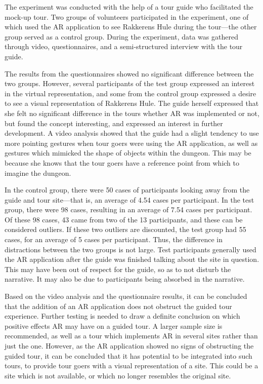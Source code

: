 The experiment was conducted with the help of a tour guide who facilitated the mock-up tour. Two groups of volunteers participated in the experiment, one of which used the AR application to see Rakkerens Hule during the tour---the other group served as a control group. During the experiment, data was gathered through video, questionnaires, and a semi-structured interview with the tour guide.

The results from the questionnaires showed no significant difference between the two groups. However, several participants of the test group expressed an interest in the virtual representation, and some from the control group expressed a desire to see a visual representation of Rakkerens Hule. The guide herself expressed that she felt no significant difference in the tours whether AR was implemented or not, but found the concept interesting, and expressed an interest in further development. A video analysis showed that the guide had a slight tendency to use more pointing gestures when tour goers were using the AR application, as well as gestures which mimicked the shape of objects within the dungeon. This may be because she knows that the tour goers have a reference point from which to imagine the dungeon.

In the control group, there were 50 cases of participants looking away from the guide and tour site---that is, an average of 4.54 cases per participant. In the test group, there were 98 cases, resulting in an average of 7.54 cases per participant. Of these 98 cases, 43 came from two of the 13 participants, and these can be considered outliers. If these two outliers are discounted, the test group had 55 cases, for an average of 5 cases per participant. Thus, the difference in distractions between the two groups is not large. Test participants generally used the AR application after the guide was finished talking about the site in question. This may have been out of respect for the guide, so as to not disturb the narrative. It may also be due to participants being absorbed in the narrative. 

Based on the video analysis and the questionnaire results, it can be concluded that the addition of an AR application does not obstruct the guided tour experience. Further testing is needed to draw a definite conclusion on which positive effects AR may have on a guided tour. A larger sample size is recommended, as well as a tour which implements AR in several sites rather than just the one. However, as the AR application showed no signs of obstructing the guided tour, it can be concluded that it has potential to be integrated into such tours, to provide tour goers with a visual representation of a site. This could be a site which is not available, or which no longer resembles the original site.